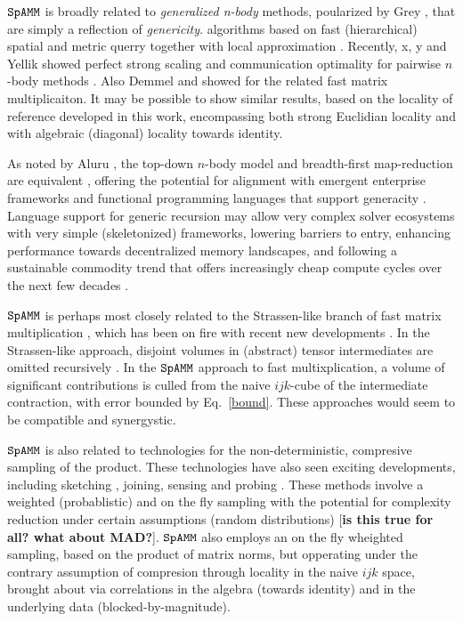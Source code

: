 \documentclass[letterpaper,twocolumn,amsmath,amsfont,amssymb,english,aps,jcp,preprintnumbers,groupaddress,nofootinbib,tightenlines,floatfix]{revtex4}
\theoremstyle{plain}
\theoremstyle{remark}
\theoremstyle{plain}
\begin{document}
$\tt SpAMM$ is broadly related to {\em generalized n-body} methods, poularized by Grey \cite{},  
that are simply a reflection of {\em genericity}.
algorithms based on fast (hierarchical) spatial and metric querry \cite{Sammet} together with local approximation \cite{}.  
Recently, x, y  and Yellik showed perfect strong scaling and communication optimality 
for pairwise $n$-body methods \cite{Warren Salmon, Yellik}.  Also Demmel and showed  for the related fast matrix multiplicaiton.
It may be possible to show similar results, based on the locality of reference developed in this work, encompassing both 
strong Euclidian locality and with algebraic (diagonal) locality towards identity.  

As noted by Aluru \cite{}, the top-down $n$-body model and breadth-first map-reduction are equivalent \cite{}, offering
the potential for alignment with emergent enterprise frameworks \cite{} and functional programming 
languages that support generacity \cite{}. Language support for generic recursion may allow very complex solver ecosystems 
with very simple (skeletonized) frameworks, lowering barriers to entry, enhancing performance towards decentralized memory landscapes, 
and following a sustainable commodity trend \cite{softwaresustainanbilty} that offers 
increasingly cheap compute cycles over the next few decades \cite{}. 

$\tt SpAMM$ is perhaps most closely related to the Strassen-like branch of fast matrix multiplication \cite{},  
which has been on fire with recent new developments \cite{}.  In the Strassen-like approach, disjoint volumes in (abstract) tensor 
intermediates are omitted recursively \cite{}.  In the $\tt SpAMM$ approach to fast multixplication, a volume of
significant contributions is culled from the naive $ijk$-cube of the intermediate contraction, 
with error bounded by Eq.~\ref{bound}.  These approaches would seem to be compatible and synergystic.

$\tt SpAMM$ is also related to technologies for the non-deterministic,  compresive sampling of the product.  These 
technologies have also seen exciting developments, including  sketching \cite{Kutzkov2012, Pagh2013}, joining, sensing and probing \cite{}.
These methods involve a weighted (probablistic) and on the fly sampling with the potential for complexity reduction under
certain assumptions (random distributions) [{\bf is this true for all? what about MAD?}].  
$\tt SpAMM$ also employs an on the fly wheighted sampling, based on the product of matrix norms, 
but opperating under the contrary assumption of compresion through locality in the naive $ijk$ space, brought about 
via correlations in the algebra (towards identity) and in the underlying data (blocked-by-magnitude).
\end{document}
